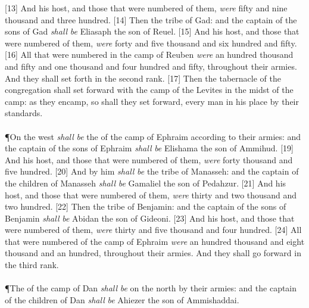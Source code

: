 [13] \textcolor[cmyk]{0.99998,1,0,0}{And his host, and those that were numbered of them, \emph{were} fifty and nine thousand and three hundred.}
[14] \textcolor[cmyk]{0.99998,1,0,0}{Then the tribe of Gad: and the captain of the sons of Gad \emph{shall} \emph{be} Eliasaph the son of Reuel.}
[15] \textcolor[cmyk]{0.99998,1,0,0}{And his host, and those that were numbered of them, \emph{were} forty and five thousand and six hundred and fifty.}
[16] \textcolor[cmyk]{0.99998,1,0,0}{All that were numbered in the camp of Reuben \emph{were} an hundred thousand and fifty and one thousand and four hundred and fifty, throughout their armies. And they shall set forth in the second rank.}
[17] \textcolor[cmyk]{0.99998,1,0,0}{Then the tabernacle of the congregation shall set forward with the camp of the Levites in the midst of the camp: as they encamp, so shall they set forward, every man in his place by their standards.}\\
\\
\P \textcolor[cmyk]{0.99998,1,0,0}{On the west  \emph{shall} \emph{be} the  of the camp of Ephraim according to their armies: and the captain of the sons of Ephraim \emph{shall} \emph{be} Elishama the son of Ammihud.}
[19] \textcolor[cmyk]{0.99998,1,0,0}{And his host, and those that were numbered of them, \emph{were} forty thousand and five hundred.}
[20] \textcolor[cmyk]{0.99998,1,0,0}{And by him \emph{shall} \emph{be} the tribe of Manasseh: and the captain of the children of Manasseh \emph{shall} \emph{be} Gamaliel the son of Pedahzur.}
[21] \textcolor[cmyk]{0.99998,1,0,0}{And his host, and those that were numbered of them, \emph{were} thirty and two thousand and two hundred.}
[22] \textcolor[cmyk]{0.99998,1,0,0}{Then the tribe of Benjamin: and the captain of the sons of Benjamin \emph{shall} \emph{be} Abidan the son of Gideoni.}
[23] \textcolor[cmyk]{0.99998,1,0,0}{And his host, and those that were numbered of them, \emph{were} thirty and five thousand and four hundred.}
[24] \textcolor[cmyk]{0.99998,1,0,0}{All that were numbered of the camp of Ephraim \emph{were} an hundred thousand and eight thousand and an hundred, throughout their armies. And they shall go forward in the third rank.}\\
\\
\P \textcolor[cmyk]{0.99998,1,0,0}{The  of the camp of Dan \emph{shall} \emph{be} on the north  by their armies: and the captain of the children of Dan \emph{shall} \emph{be} Ahiezer the son of Ammishaddai.}
